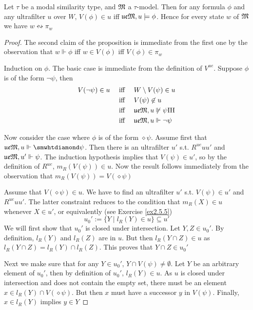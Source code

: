 \documentclass[11pt]{article}
\newcommand{\ue}{\fu\fe}
\begin{document}
\begin{proposition}[]
\label{prop2.59}
Let \(\tau\) be a modal similarity type, and \(\mathfrak{M}\) a \(\tau\)-model. Then for any
formula \(\phi\) and any ultrafilter \(u\) over \(W\), \(V(\phi)\in u\) iff
\(\ue\fM,u\models\phi\). Hence for every state \(w\) of \(\mathfrak{M}\) we have
\(w\leftrightsquigarrow \pi_w\)
\end{proposition}

\begin{proof}
The second claim of the proposition is immediate from the first one by the
observation that \(w\Vdash\phi\) iff \(w\in V(\phi)\) iff \(V(\phi)\in\pi_w\)

Induction on \(\phi\). The basic case is immediate from the definition of
\(V^{ue}\). Suppose \(\phi\) is of the form \(\neg\psi\), then
\begin{align*}
V(\neg\psi)\in u&\quad\text{ iff }\quad
W\setminus V(\psi)\in u\\
&\quad\text{ iff }\quad V(\psi)\not\in u\\
&\quad\text{ iff }\quad \ue\fM,u\not\Vdash\psi\text{IH}\\
&\quad\text{ iff }\quad \ue\fM,u\Vdash\neg\psi
\end{align*}

Now consider the case where \(\phi\) is of the form \(\diamond\psi\). Assume first
that \(\ue\fM,u\Vdash\diamond\psi\). Then there is an ultrafilter \(u'\)
s.t. \(R^{ue}uu'\) and \(\ue\fM,u'\Vdash\psi\). The induction hypothesis
implies that \(V(\psi)\in u'\), so by the definition of \(R^{ue}\),
\(m_R(V(\psi))\in u\). Now the result follows immediately from the observation
that \(m_R(V(\psi))=V(\diamond\psi)\)

Assume that \(V(\diamond\psi)\in u\). We have to find an ultrafilter \(u'\)
s.t. \(V(\psi)\in u'\) and \(R^{ue}uu'\). The latter constraint reduces to the
condition that \(m_R(X)\in u\) whenever \(X\in u'\), or equivalently (see
Exercise \ref{ex2.5.5})
\begin{equation*}
u_0':=\{Y\mid l_R(Y)\in u\}\subseteq u'
\end{equation*}
We will first show that \(u_0'\) is closed under intersection. Let \(Y,Z\in
    u_0'\). By definition, \(l_R(Y)\) and \(l_R(Z)\) are in \(u\). But then
\(l_R(Y\cap Z)\in u\) as \(l_R(Y\cap Z)=l_R(Y)\cap l_R(Z)\). This proves
that \(Y\cap Z\in u_0'\)

Next we make sure that for any \(Y\in u_0'\), \(Y\cap V(\psi)\neq\emptyset\).
Let \(Y\) be an arbitrary element of \(u_0'\), then by definition of
\(u_0'\), \(l_R(Y)\in u\). As \(u\) is closed under intersection and does
not contain the empty set, there must be an element \(x\in l_R(Y)\cap
    V(\diamond\psi)\). But then \(x\) must have a successor \(y\) in \(V(\psi)\).
Finally, \(x\in l_R(Y)\) implies \(y\in Y\)


\end{proof}
\end{document}
